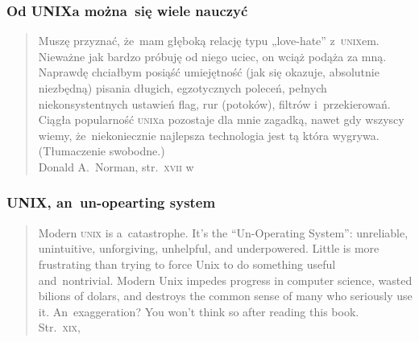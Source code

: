 \documentclass[10pt,t]{beamer}
\begin{document}
\begin{frame}
  \frametitle{Od UNIXa można~się wiele nauczyć}


  \begin{quote}

    Muszę przyznać, że~mam głęboką relację typu „love-hate”
    z~\textsc{unix}em.
    Nieważne jak bardzo próbuję od niego uciec, on wciąż podąża za mną.
    Naprawdę chciałbym posiąść umiejętność (jak się okazuje, absolutnie
    niezbędną) pisania długich, egzotycznych poleceń, pełnych
    niekonsystentnych ustawień flag, rur (potoków), filtrów i~przekierowań.
    Ciągła
    popularność \textsc{unix}a pozostaje dla mnie zagadką, nawet gdy
    wszyscy wiemy, że~niekoniecznie najlepsza technologia jest tą która
    wygrywa. (Tłumaczenie swobodne.) \\
    Donald A.~Norman, str.~\textsc{xvii}
    w~\parencite{Garfinkel-Weise-Strassmann-The-UNIX-HATERS-Handbook-Pub-1994}

  \end{quote}

\end{frame}





\begin{frame}
  \frametitle{UNIX, an~un-opearting system}


  \begin{quote}

    Modern \textsc{unix} is a~catastrophe. It's the ``Un-Operating System'':
    unreliable, unintuitive, unforgiving, unhelpful, and underpowered.
    Little is more frustrating than trying to force Unix to do something
    useful and~nontrivial. Modern Unix impedes progress in computer
    science, wasted bilions of dolars, and destroys the common sense of
    many who seriously use it. An~exaggeration? You won't think so after
    reading this book. \\
    Str.~\textsc{xix},
    \parencite{Garfinkel-Weise-Strassmann-The-UNIX-HATERS-Handbook-Pub-1994}

  \end{quote}

\end{frame}
\end{document}
